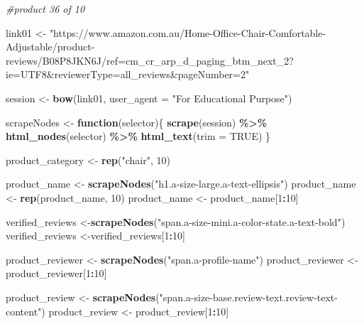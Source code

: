 \documentclass[
]{article}
\newenvironment{Shaded}{\begin{snugshade}}{\end{snugshade}}
\newcommand{\AttributeTok}[1]{\textcolor[rgb]{0.13,0.29,0.53}{#1}}
\newcommand{\CommentTok}[1]{\textcolor[rgb]{0.56,0.35,0.01}{\textit{#1}}}
\newcommand{\ConstantTok}[1]{\textcolor[rgb]{0.56,0.35,0.01}{#1}}
\newcommand{\ControlFlowTok}[1]{\textcolor[rgb]{0.13,0.29,0.53}{\textbf{#1}}}
\newcommand{\DecValTok}[1]{\textcolor[rgb]{0.00,0.00,0.81}{#1}}
\newcommand{\FunctionTok}[1]{\textcolor[rgb]{0.13,0.29,0.53}{\textbf{#1}}}
\newcommand{\NormalTok}[1]{#1}
\newcommand{\OtherTok}[1]{\textcolor[rgb]{0.56,0.35,0.01}{#1}}
\newcommand{\SpecialCharTok}[1]{\textcolor[rgb]{0.81,0.36,0.00}{\textbf{#1}}}
\newcommand{\StringTok}[1]{\textcolor[rgb]{0.31,0.60,0.02}{#1}}
\begin{document}
\begin{Shaded}
\begin{Highlighting}[]
\CommentTok{\#product 36 of 10}

\NormalTok{link01 }\OtherTok{\textless{}{-}} \StringTok{"https://www.amazon.com.au/Home{-}Office{-}Chair{-}Comfortable{-}Adjustable/product{-}reviews/B08P8JKN6J/ref=cm\_cr\_arp\_d\_paging\_btm\_next\_2?ie=UTF8\&reviewerType=all\_reviews\&pageNumber=2"}


\NormalTok{  session }\OtherTok{\textless{}{-}} \FunctionTok{bow}\NormalTok{(link01,}
               \AttributeTok{user\_agent =} \StringTok{"For Educational Purpose"}\NormalTok{)}

\NormalTok{  scrapeNodes }\OtherTok{\textless{}{-}} \ControlFlowTok{function}\NormalTok{(selector)\{}
    \FunctionTok{scrape}\NormalTok{(session) }\SpecialCharTok{\%\textgreater{}\%}
      \FunctionTok{html\_nodes}\NormalTok{(selector) }\SpecialCharTok{\%\textgreater{}\%}
      \FunctionTok{html\_text}\NormalTok{(}\AttributeTok{trim =} \ConstantTok{TRUE}\NormalTok{)}
\NormalTok{  \}}

\NormalTok{  product\_category }\OtherTok{\textless{}{-}} \FunctionTok{rep}\NormalTok{(}\StringTok{"chair"}\NormalTok{, }\DecValTok{10}\NormalTok{)}

\NormalTok{  product\_name }\OtherTok{\textless{}{-}} \FunctionTok{scrapeNodes}\NormalTok{(}\StringTok{"h1.a{-}size{-}large.a{-}text{-}ellipsis"}\NormalTok{)}
\NormalTok{  product\_name }\OtherTok{\textless{}{-}} \FunctionTok{rep}\NormalTok{(product\_name, }\DecValTok{10}\NormalTok{)}
\NormalTok{  product\_name }\OtherTok{\textless{}{-}}\NormalTok{ product\_name[}\DecValTok{1}\SpecialCharTok{:}\DecValTok{10}\NormalTok{]}
  
\NormalTok{  verified\_reviews }\OtherTok{\textless{}{-}}\FunctionTok{scrapeNodes}\NormalTok{(}\StringTok{"span.a{-}size{-}mini.a{-}color{-}state.a{-}text{-}bold"}\NormalTok{)}
\NormalTok{  verified\_reviews }\OtherTok{\textless{}{-}}\NormalTok{verified\_reviews[}\DecValTok{1}\SpecialCharTok{:}\DecValTok{10}\NormalTok{]}
  
\NormalTok{  product\_reviewer }\OtherTok{\textless{}{-}} \FunctionTok{scrapeNodes}\NormalTok{(}\StringTok{"span.a{-}profile{-}name"}\NormalTok{)}
\NormalTok{  product\_reviewer }\OtherTok{\textless{}{-}}\NormalTok{ product\_reviewer[}\DecValTok{1}\SpecialCharTok{:}\DecValTok{10}\NormalTok{]}
  
\NormalTok{  product\_review }\OtherTok{\textless{}{-}} \FunctionTok{scrapeNodes}\NormalTok{(}\StringTok{"span.a{-}size{-}base.review{-}text.review{-}text{-}content"}\NormalTok{)}
\NormalTok{  product\_review }\OtherTok{\textless{}{-}}\NormalTok{ product\_review[}\DecValTok{1}\SpecialCharTok{:}\DecValTok{10}\NormalTok{]}
  

\end{Highlighting}
\end{Shaded}
\end{document}
